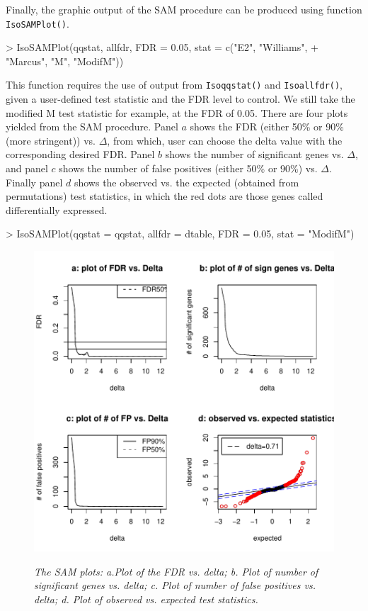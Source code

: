 \documentclass[10pt]{mybook4}
\begin{document}
Finally, the graphic output of the SAM procedure can be produced using function \texttt{IsoSAMPlot()}.

\begin{Schunk}
\begin{Sinput}
> IsoSAMPlot(qqstat, allfdr, FDR = 0.05, stat = c("E2", "Williams", 
+     "Marcus", "M", "ModifM"))
\end{Sinput}
\end{Schunk}

This function requires the use of output from \texttt{Isoqqstat()} and \texttt{Isoallfdr()}, given a user-defined test statistic
and the FDR level to control. We still take the modified M test statistic for example, at the FDR of 0.05. There are four plots
yielded from the SAM procedure. Panel $a$ shows the FDR (either 50\% or 90\% (more stringent)) vs. $\Delta$, from which, user can choose the delta value with
the corresponding desired FDR. Panel $b$ shows the number of significant genes vs. $\Delta$, and panel $c$ shows the number of false positives (either 50\% or 90\%) vs. $\Delta$. Finally panel $d$ shows the observed vs. the expected (obtained from permutations) test statistics, in which the red dots are those genes called differentially expressed.

\begin{Schunk}
\begin{Sinput}
> IsoSAMPlot(qqstat = qqstat, allfdr = dtable, FDR = 0.05, stat = "ModifM")
\end{Sinput}
\end{Schunk}



\begin{figure}[!h]
\centering
{\includegraphics[width=.7\textwidth]{IsoGene-IsoSAMPlotOutput}}
\caption{\em {The SAM plots: a.Plot of the FDR vs. delta; b. Plot of number of significant genes vs. delta; c. Plot of
number of false positives vs. delta; d. Plot of observed vs. expected test statistics.}} \label{IsoBHPlot}
\end{figure}
\end{document}
